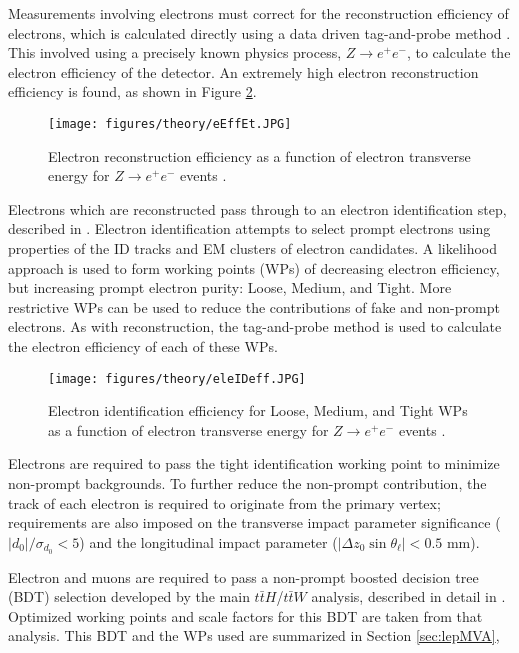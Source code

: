 Measurements involving electrons must correct for the reconstruction efficiency of electrons, which is calculated directly using a data driven tag-and-probe method \cite{tagAndProbe}. This involved using a precisely known physics process, $Z\rightarrow e^+e^-$, to calculate the electron efficiency of the detector. An extremely high electron reconstruction efficiency is found, as shown in Figure \ref{fig:eEffEt}.

\begin{figure}[H]
\centering
   \texttt{[image: figures/theory/eEffEt.JPG]}
\caption{Electron reconstruction efficiency as a function of electron transverse energy for $Z\rightarrow e^+e^-$ events \cite{tagAndProbe}.}
\label{fig:eEffEt}
\end{figure}

Electrons which are reconstructed pass through to an electron identification step, described in \cite{tagAndProbe}. Electron identification attempts to select prompt electrons using properties of the ID tracks and EM clusters of electron candidates.  A likelihood approach is used to form working points (WPs) of decreasing electron efficiency, but increasing prompt electron purity: Loose, Medium, and Tight. More restrictive WPs can be used to reduce the contributions of fake and non-prompt electrons. As with reconstruction, the tag-and-probe method is used to calculate the electron efficiency of each of these WPs. 

\begin{figure}[H]
\centering
   \texttt{[image: figures/theory/eleIDeff.JPG]}
\caption{Electron identification efficiency for Loose, Medium, and Tight WPs as a function of electron transverse energy for $Z\rightarrow e^+e^-$ events \cite{tagAndProbe}.}
\label{fig:eEffEt}
\end{figure}

Electrons are required to pass the tight identification working point to minimize non-prompt backgrounds. To further reduce the non-prompt contribution, the track of each electron is required to originate from the primary vertex; requirements are also imposed on the transverse impact parameter significance ($|d_0|/\sigma_{d_0}<5$) and the longitudinal impact parameter ($|\Delta z_0 \sin \theta_\ell|<0.5$ mm).

Electron and muons are required to pass a non-prompt boosted decision tree (BDT) selection developed by the main $t\bar{t}H$/$t\bar{t}W$ analysis, described in detail in \cite{ttH_paper}. Optimized working points and scale factors for this BDT are taken from that analysis. This BDT and the WPs used are summarized in Section \ref{sec:lepMVA},

